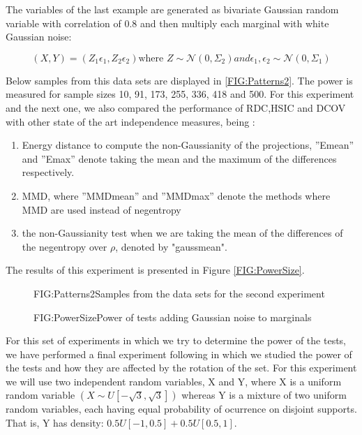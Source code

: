 The variables of the last example are generated as bivariate Gaussian random variable with correlation of 0.8 and then multiply each marginal with white Gaussian noise:

$$(X,Y) = (Z_{1}\epsilon_{1},Z_{2}\epsilon_{2}) \text{where } Z\sim\mathcal{N}(0,\Sigma_{2}) and \epsilon_{1},\epsilon_{2}\sim\mathcal{N}(0,\Sigma_{1})$$

Below samples from this data sets are displayed in \ref{FIG:Patterns2}. The power is measured for sample sizes 10,  91, 173, 255, 336, 418 and 500. For this experiment and the next one, we also compared the performance of RDC,HSIC and DCOV with other state of the art independence measures, being : 

\begin{enumerate}
\item Energy distance to compute the non-Gaussianity of the projections, ”Emean” and ”Emax” denote taking the mean and the maximum of the differences respectively.
\item MMD, where ”MMDmean” and ”MMDmax” denote the methods where
MMD are used instead of negentropy
\item the non-Gaussianity test when we are taking the mean of the differences of the negentropy over $\rho$, denoted by "gaussmean".
\end{enumerate}

The results of this experiment is presented in Figure \ref{FIG:PowerSize}. 

\begin{figure}[Non linear dependance patterns example 2]{FIG:Patterns2}{Samples from the data sets for the second experiment}
\end{figure}

\begin{figure}[Power of tests increasing sample size]{FIG:PowerSize}{Power of tests adding Gaussian noise to marginals}
\end{figure}

For this set of experiments in which we try to determine the power of the tests, we have performed a final experiment following \cite{Size} in which we studied the power of the tests and how they are affected by the rotation of the set.
For this experiment we will use two independent random variables, X and Y, where X is a uniform random variable $(X\sim U[-\sqrt{3},\sqrt{3}])$ whereas Y is a mixture of two uniform random variables, each having equal probability of ocurrence on disjoint supports. That is, Y has density: $0.5U[-1,0.5] + 0.5U[0.5,1]$.


